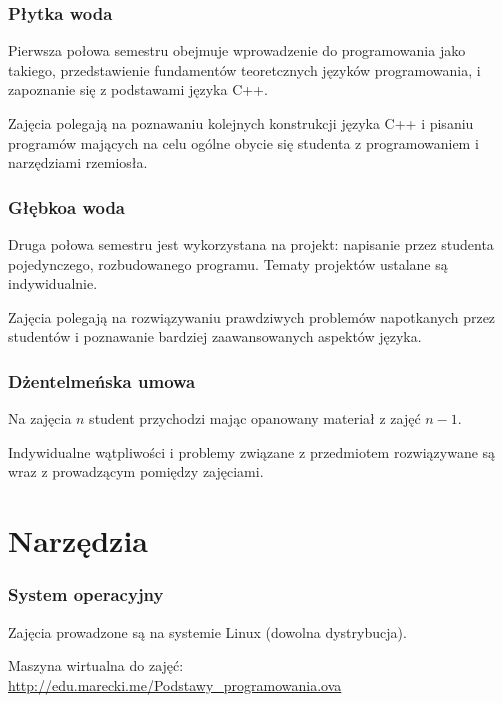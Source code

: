 \documentclass[aspectratio=169]{beamer}
\begin{document}
\begin{frame}
    \frametitle{Płytka woda}

    Pierwsza połowa semestru obejmuje wprowadzenie do programowania jako
    takiego, przedstawienie fundamentów teoretcznych języków programowania, i
    zapoznanie się z podstawami języka C++.

    \vspace{1em}

    Zajęcia polegają na poznawaniu kolejnych konstrukcji języka C++ i pisaniu
    programów mających na celu ogólne obycie się studenta z programowaniem i
    narzędziami rzemiosła.
\end{frame}

\begin{frame}
    \frametitle{Głębkoa woda}

    Druga połowa semestru jest wykorzystana na projekt: napisanie przez studenta
    pojedynczego, rozbudowanego programu. Tematy projektów ustalane są
    indywidualnie.

    \vspace{1em}

    Zajęcia polegają na rozwiązywaniu prawdziwych problemów napotkanych przez
    studentów i poznawanie bardziej zaawansowanych aspektów języka.
\end{frame}

\begin{frame}
    \frametitle{Dżentelmeńska umowa}

    Na zajęcia $n$ student przychodzi mając opanowany materiał z zajęć $n-1$.

    \vspace{1em}

    Indywidualne wątpliwości i problemy związane z przedmiotem rozwiązywane są
    wraz z prowadzącym pomiędzy zajęciami.
\end{frame}

\section{Narzędzia}

\begin{frame}
    \frametitle{System operacyjny}

    Zajęcia prowadzone są na systemie Linux (dowolna dystrybucja).

    {\tiny Maszyna wirtualna do zajęć:
    \url{http://edu.marecki.me/Podstawy_programowania.ova}}
\end{frame}
\end{document}
